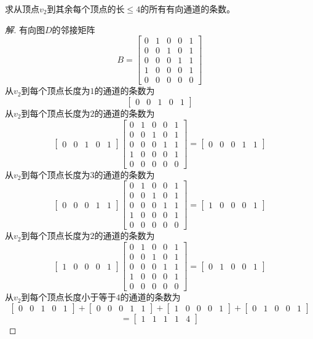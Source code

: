 \documentclass{article}
\begin{document}
\begin{CJK}{UTF8}{gbsn}
\begin{Exercise}
求从顶点$v_2$到其余每个顶点的长$\leq 4$的所有有向通道的条数。 
\end{Exercise}
\begin{proof}[解]
  有向图$D$的邻接矩阵
  \[B=\begin{bmatrix}0&1&0&0&1\\0&0&1&0&1\\0&0&0&1&1\\1&0&0&0&1\\0&0&0&0&0\end{bmatrix}\]
  从$v_2$到每个顶点长度为$1$的通道的条数为
  \[\begin{bmatrix}0&0&1&0&1\end{bmatrix}\]
  从$v_2$到每个顶点长度为$2$的通道的条数为
  \[\begin{bmatrix}0&0&1&0&1\end{bmatrix}\begin{bmatrix}0&1&0&0&1\\0&0&1&0&1\\0&0&0&1&1\\1&0&0&0&1\\0&0&0&0&0\end{bmatrix}=\begin{bmatrix}0&0&0&1&1\end{bmatrix}\]
  从$v_2$到每个顶点长度为$3$的通道的条数为
  \[\begin{bmatrix}0&0&0&1&1\end{bmatrix}\begin{bmatrix}0&1&0&0&1\\0&0&1&0&1\\0&0&0&1&1\\1&0&0&0&1\\0&0&0&0&0\end{bmatrix}=\begin{bmatrix}1&0&0&0&1\end{bmatrix}\]
  从$v_2$到每个顶点长度为$2$的通道的条数为
  \[\begin{bmatrix}1&0&0&0&1\end{bmatrix}\begin{bmatrix}0&1&0&0&1\\0&0&1&0&1\\0&0&0&1&1\\1&0&0&0&1\\0&0&0&0&0\end{bmatrix}=\begin{bmatrix}0&1&0&0&1\end{bmatrix}\]
 从$v_2$到每个顶点长度小于等于$4$的通道的条数为
\[\begin{bmatrix}0&0&1&0&1\end{bmatrix} + \begin{bmatrix}0&0&0&1&1\end{bmatrix} + \begin{bmatrix}1&0&0&0&1\end{bmatrix} + \begin{bmatrix}0&1&0&0&1\end{bmatrix}\]
   \[= \begin{bmatrix}1&1&1&1&4\end{bmatrix}\]


\end{proof}
\end{CJK}
\end{document}
